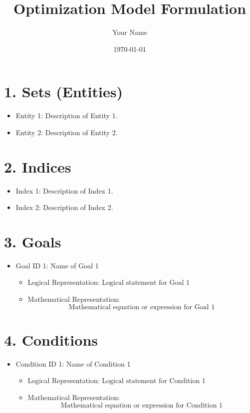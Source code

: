 \documentclass[a4paper,12pt]{article}
\title{Optimization Model Formulation}
\author{Your Name}
\date{\today}
\begin{document}
\maketitle

\tableofcontents
\newpage

\section{1. Sets (Entities)}
\begin{itemize}[noitemsep]
    \item Entity 1: Description of Entity 1.
    \item Entity 2: Description of Entity 2.
\end{itemize}

\section{2. Indices}
\begin{itemize}[noitemsep]
    \item Index 1: Description of Index 1.
    \item Index 2: Description of Index 2.
\end{itemize}

\section{3. Goals}
\begin{itemize}[noitemsep]
    \item Goal ID 1: Name of Goal 1
    \begin{itemize}
        \item Logical Representation: $\text{Logical statement for Goal 1}$
        \item Mathematical Representation: 
        \[
            \text{Mathematical equation or expression for Goal 1}
        \]
    \end{itemize}
    
\end{itemize}

\section{4. Conditions}
\begin{itemize}[noitemsep]
    \item Condition ID 1: Name of Condition 1
    \begin{itemize}
        \item Logical Representation: $\text{Logical statement for Condition 1}$
        \item Mathematical Representation:
        \[
            \text{Mathematical equation or expression for Condition 1}
        \]
    \end{itemize}

\end{itemize}
\end{document}
